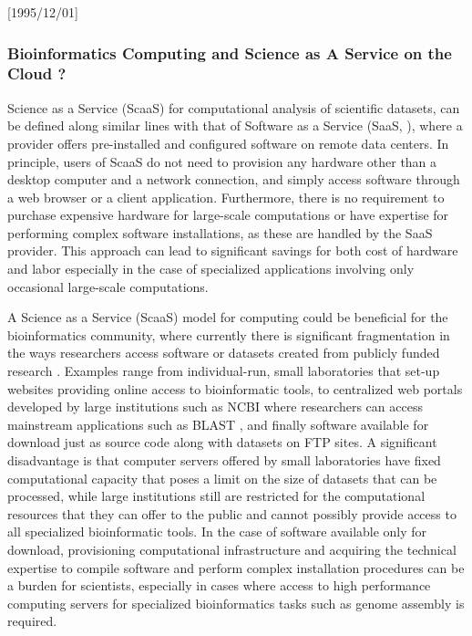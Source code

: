 \NeedsTeXFormat{LaTeX2e}[1995/12/01] \documentclass[10pt]{bmc_article}
\newenvironment{bmcformat}{\begin{raggedright}\baselineskip20pt\sloppy\setboolean{publ}{false}}{\end{raggedright}\baselineskip20pt\sloppy}
\begin{document}
\begin{bmcformat}
\subsubsection*{Bioinformatics Computing and Science as A Service on the Cloud ?}

Science as a Service (ScaaS) for computational analysis of scientific datasets, can be defined along similar 
lines with that of Software as a Service (SaaS, \cite{papazoglou2003}), where a provider offers pre-installed 
and configured software on remote data centers. In principle, users of  ScaaS do not need to provision any 
hardware other than a desktop computer and a network connection, and simply access software through a 
web  browser or a client application. Furthermore, there is no requirement to purchase expensive hardware 
for  large-scale computations or have expertise for performing complex software installations, as these are 
handled by the SaaS provider. This approach can lead to significant savings for both cost of hardware and labor
especially in the case of specialized applications involving only occasional large-scale computations.

A Science as a Service (ScaaS) model for computing could be beneficial for the bioinformatics community, 
where currently there is significant fragmentation in the ways researchers access software or datasets
created from publicly funded research \cite{Stein2010}.  Examples range from individual-run, small laboratories 
that set-up websites providing online access to bioinformatic tools, to centralized web portals developed by large 
institutions such as NCBI where researchers can access mainstream applications such as BLAST \cite{altchul}, 
and finally software available for download just as source code along with datasets on FTP sites. A significant 
disadvantage is that computer servers offered by small laboratories have fixed computational capacity that 
poses a limit on the size of datasets that can be processed, while large institutions still are restricted 
for the computational resources that they can offer to the public and cannot possibly provide access to all 
specialized bioinformatic tools. In the case of software available only for download, provisioning computational 
infrastructure and acquiring the technical expertise to compile software and perform complex installation 
procedures can be a burden for scientists, especially in cases where access to high performance computing 
servers for specialized bioinformatics tasks such as genome assembly is required. 



\end{bmcformat}
\end{document}
